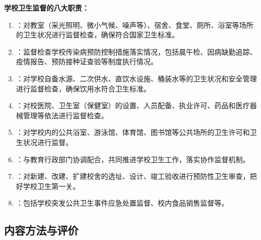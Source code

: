 \begin{keybox}
\textbf{学校卫生监督的八大职责：}

\begin{enumerate}[leftmargin=*]
    \item {}：对教室（采光照明、微小气候、噪声等）、宿舍、食堂、厕所、浴室等场所的卫生状况进行监督检查，确保符合国家卫生标准。

    \item {}：监督检查学校传染病预防控制措施落实情况，包括晨午检、因病缺勤追踪、疫情报告、预防接种证查验等制度执行情况。

    \item {}：对学校自备水源、二次供水、直饮水设施、桶装水等的卫生状况和安全管理进行监督检查，确保饮用水符合卫生标准。

    \item {}：对校医院、卫生室（保健室）的设置、人员配备、执业许可、药品和医疗器械管理等依法进行监督检查。

    \item {}：对学校内的公共浴室、游泳馆、体育馆、图书馆等公共场所的卫生许可和卫生状况进行监督。

    \item {}：与教育行政部门协调配合，共同推进学校卫生工作，落实协作监督机制。

    \item {}：对新建、改建、扩建校舍的选址、设计、竣工验收进行预防性卫生审查，把好学校卫生第一关。

    \item {}：包括学校突发公共卫生事件应急处置监督、校内食品销售监督等。
\end{enumerate}
\end{keybox}

\subsection{内容方法与评价}

